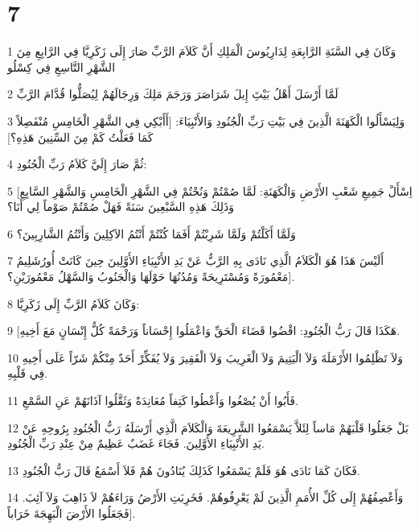 \chapter{7}

\par 1 وَكَانَ فِي السَّنَةِ الرَّابِعَةِ لِدَارِيُوسَ الْمَلِكِ أَنَّ كَلاَمَ الرَّبِّ صَارَ إِلَى زَكَرِيَّا فِي الرَّابِعِ مِنَ الشَّهْرِ التَّاسِعِ فِي كِسْلُو
\par 2 لَمَّا أَرْسَلَ أَهْلُ بَيْتَِ إِيلَ شَرَاصَرَ وَرَجَمَ مَلِكَ وَرِجَالَهُمْ لِيُصَلُّوا قُدَّامَ الرَّبِّ
\par 3 وَلِيَسْأَلُوا الْكَهَنَةَ الَّذِينَ فِي بَيْتِ رَبِّ الْجُنُودِ وَالأَنْبِيَاءَ: [أَأَبْكِي فِي الشَّهْرِ الْخَامِسِ مُنْفَصِلاً كَمَا فَعَلْتُ كَمْ مِنَ السِّنِينَ هَذِهِ؟]
\par 4 ثُمَّ صَارَ إِلَيَّ كَلاَمُ رَبِّ الْجُنُودِ:
\par 5 [اِسْأَلْ جَمِيعِ شَعْبِ الأَرْضِ وَالْكَهَنَةِ: لَمَّا صُمْتُمْ وَنُحْتُمْ فِي الشَّهْرِ الْخَامِسِ وَالشَّهْرِ السَّابِعِ وَذَلِكَ هَذِهِ السَّبْعِينَ سَنَةً فَهَلْ صُمْتُمْ صَوْماً لِي أَنَا؟
\par 6 وَلَمَّا أَكَلْتُمْ وَلَمَّا شَرِبْتُمْ أَفَمَا كُنْتُمْ أَنْتُمُ الآكِلِينَ وَأَنْتُمُ الشَّارِبِينَ؟
\par 7 أَلَيْسَ هَذَا هُوَ الْكَلاَمُ الَّذِي نَادَى بِهِ الرَّبُّ عَنْ يَدِ الأَنْبِيَاءِ الأَوَّلِينَ حِينَ كَانَتْ أُورُشَلِيمُ مَعْمُورَةً وَمُسْتَرِيحَةً وَمُدُنُهَا حَوْلَهَا وَالْجَنُوبُ وَالسَّهْلُ مَعْمُورَيْنِ؟].
\par 8 وَكَانَ كَلاَمُ الرَّبِّ إِلَى زَكَرِيَّا:
\par 9 [هَكَذَا قَالَ رَبُّ الْجُنُودِ: اقْضُوا قَضَاءَ الْحَقِّ وَاعْمَلُوا إِحْسَاناً وَرَحْمَةً كُلُّ إِنْسَانٍ مَعَ أَخِيهِ.
\par 10 وَلاَ تَظْلِمُوا الأَرْمَلَةَ وَلاَ الْيَتِيمَ وَلاَ الْغَرِيبَ وَلاَ الْفَقِيرَ وَلاَ يُفَكِّرْ أَحَدٌ مِنْكُمْ شَرّاً عَلَى أَخِيهِ فِي قَلْبِهِ.
\par 11 فَأَبُوا أَنْ يُصْغُوا وَأَعْطُوا كَتِفاً مُعَانِدَةً وَثَقَّلُوا آذَانَهُمْ عَنِ السَّمْعِ.
\par 12 بَلْ جَعَلُوا قَلْبَهُمْ مَاساً لِئَلاَّ يَسْمَعُوا الشَّرِيعَةَ وَالْكَلاَمَ الَّذِي أَرْسَلَهُ رَبُّ الْجُنُودِ بِرُوحِهِ عَنْ يَدِ الأَنْبِيَاءِ الأَوَّلِينَ. فَجَاءَ غَضَبٌ عَظِيمٌ مِنْ عِنْدِ رَبِّ الْجُنُودِ.
\par 13 فَكَانَ كَمَا نَادَى هُوَ فَلَمْ يَسْمَعُوا كَذَلِكَ يُنَادُونَ هُمْ فَلاَ أَسْمَعُ قَالَ رَبُّ الْجُنُودِ.
\par 14 وَأَعْصِفُهُمْ إِلَى كُلِّ الأُمَمِ الَّذِينَ لَمْ يَعْرِفُوهُمْ. فَخَرِبَتِ الأَرْضُ وَرَاءَهُمْ لاَ ذَاهِبَ وَلاَ آئِبَ. فَجَعَلُوا الأَرْضَ الْبَهِجَةَ خَرَاباً].

